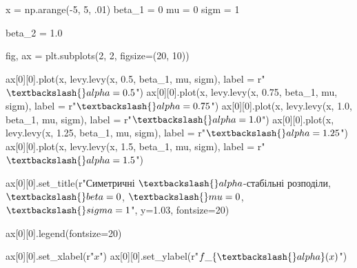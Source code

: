\documentclass[
  letterpaper,
]{report}
\newenvironment{Shaded}{\begin{snugshade}}{\end{snugshade}}
\newcommand{\DecValTok}[1]{\textcolor[rgb]{0.68,0.00,0.00}{#1}}
\newcommand{\FloatTok}[1]{\textcolor[rgb]{0.68,0.00,0.00}{#1}}
\newcommand{\NormalTok}[1]{\textcolor[rgb]{0.00,0.23,0.31}{#1}}
\newcommand{\OperatorTok}[1]{\textcolor[rgb]{0.37,0.37,0.37}{#1}}
\newcommand{\VerbatimStringTok}[1]{\textcolor[rgb]{0.13,0.47,0.30}{#1}}
\begin{document}
\begin{Shaded}
\begin{Highlighting}[]
\NormalTok{x }\OperatorTok{=}\NormalTok{ np.arange(}\OperatorTok{{-}}\DecValTok{5}\NormalTok{, }\DecValTok{5}\NormalTok{, }\FloatTok{.01}\NormalTok{)}
\NormalTok{beta\_1 }\OperatorTok{=} \DecValTok{0}
\NormalTok{mu }\OperatorTok{=} \DecValTok{0} 
\NormalTok{sigm }\OperatorTok{=} \DecValTok{1} 

\NormalTok{beta\_2 }\OperatorTok{=} \FloatTok{1.0}

\NormalTok{fig, ax }\OperatorTok{=}\NormalTok{ plt.subplots(}\DecValTok{2}\NormalTok{, }\DecValTok{2}\NormalTok{, figsize}\OperatorTok{=}\NormalTok{(}\DecValTok{20}\NormalTok{, }\DecValTok{10}\NormalTok{))}

\NormalTok{ax[}\DecValTok{0}\NormalTok{][}\DecValTok{0}\NormalTok{].plot(x, levy.levy(x, }\FloatTok{0.5}\NormalTok{, beta\_1, mu, sigm), label }\OperatorTok{=} \VerbatimStringTok{r"$ \textbackslash{}alpha=0.5 $"}\NormalTok{)}
\NormalTok{ax[}\DecValTok{0}\NormalTok{][}\DecValTok{0}\NormalTok{].plot(x, levy.levy(x, }\FloatTok{0.75}\NormalTok{, beta\_1, mu, sigm), label }\OperatorTok{=} \VerbatimStringTok{r"$ \textbackslash{}alpha=0.75 $"}\NormalTok{)}
\NormalTok{ax[}\DecValTok{0}\NormalTok{][}\DecValTok{0}\NormalTok{].plot(x, levy.levy(x, }\FloatTok{1.0}\NormalTok{, beta\_1, mu, sigm), label }\OperatorTok{=} \VerbatimStringTok{r"$ \textbackslash{}alpha=1.0 $"}\NormalTok{)}
\NormalTok{ax[}\DecValTok{0}\NormalTok{][}\DecValTok{0}\NormalTok{].plot(x, levy.levy(x, }\FloatTok{1.25}\NormalTok{, beta\_1, mu, sigm), label }\OperatorTok{=} \VerbatimStringTok{r"$ \textbackslash{}alpha=1.25 $"}\NormalTok{)}
\NormalTok{ax[}\DecValTok{0}\NormalTok{][}\DecValTok{0}\NormalTok{].plot(x, levy.levy(x, }\FloatTok{1.5}\NormalTok{, beta\_1, mu, sigm), label }\OperatorTok{=} \VerbatimStringTok{r"$ \textbackslash{}alpha=1.5 $"}\NormalTok{)}

\NormalTok{ax[}\DecValTok{0}\NormalTok{][}\DecValTok{0}\NormalTok{].set\_title(}\VerbatimStringTok{r"Симетричні $\textbackslash{}alpha${-}стабільні розподіли, $ \textbackslash{}beta = 0 $, $ \textbackslash{}mu = 0 $, $ \textbackslash{}sigma = 1 $"}\NormalTok{, y}\OperatorTok{=}\FloatTok{1.03}\NormalTok{, fontsize}\OperatorTok{=}\DecValTok{20}\NormalTok{)}

\NormalTok{ax[}\DecValTok{0}\NormalTok{][}\DecValTok{0}\NormalTok{].legend(fontsize}\OperatorTok{=}\DecValTok{20}\NormalTok{)}

\NormalTok{ax[}\DecValTok{0}\NormalTok{][}\DecValTok{0}\NormalTok{].set\_xlabel(}\VerbatimStringTok{r"$ x $"}\NormalTok{)}
\NormalTok{ax[}\DecValTok{0}\NormalTok{][}\DecValTok{0}\NormalTok{].set\_ylabel(}\VerbatimStringTok{r"$ f\_\{\textbackslash{}alpha\}(x) $"}\NormalTok{)}



\end{Highlighting}
\end{Shaded}
\end{document}
